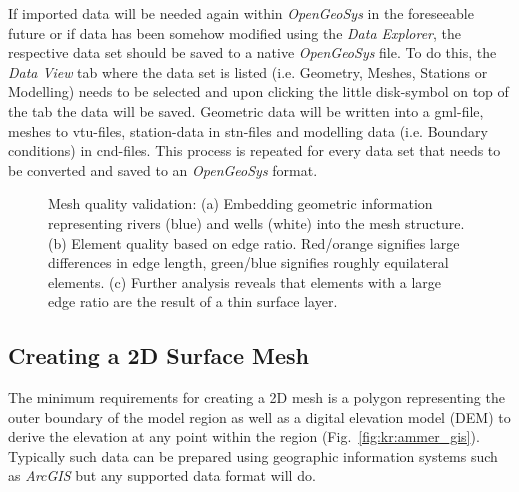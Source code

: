 If imported data will be needed again within \emph{OpenGeoSys} in the foreseeable future or if data has been somehow modified using the \emph{Data Explorer}, the respective data set should be saved to a native \emph{OpenGeoSys} file. To do this, the \emph{Data View} tab where the data set is listed (i.e. Geometry, Meshes, Stations or Modelling) needs to be selected and upon clicking the little disk-symbol on top of the tab the data will be saved. Geometric data will be written into a gml-file, meshes to vtu-files, station-data in stn-files and modelling data (i.e. Boundary conditions) in cnd-files. This process is repeated for every data set that needs to be converted and saved to an \emph{OpenGeoSys} format.

\begin{figure}[t]
\begin{center}
\enspace
{}\enspace
{}
\end{center}
\caption{Mesh quality validation: (a) Embedding geometric information representing rivers (blue) and wells (white) into the mesh structure. (b) Element quality based on edge ratio. Red/orange signifies large differences in edge length, green/blue signifies roughly equilateral elements. (c) Further analysis reveals that elements with a large edge ratio are the result of a thin surface layer.}
\label{fig:kr:meshqual}
\end{figure}

\subsection{Creating a 2D Surface Mesh}

The minimum requirements for creating a 2D mesh is a polygon representing the outer boundary of the model region as well as a digital elevation model (DEM) to derive the elevation at any point within the region (Fig.~\ref{fig:kr:ammer_gis}). Typically such data can be prepared using geographic information systems such as \emph{ArcGIS} but any supported data format will do.

